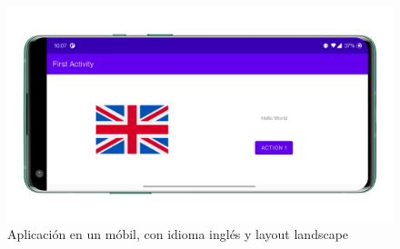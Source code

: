 \documentclass[12pt, letterpaper]{article}
\begin{document}
\begin{figure}[!htbp]
    \includegraphics[scale = 0.12]{smartphone-land.PNG}
    \centering
    \caption{Aplicación en un móbil, con idioma inglés y layout landscape}
    \label{vertical}
\end{figure}
\end{document}
